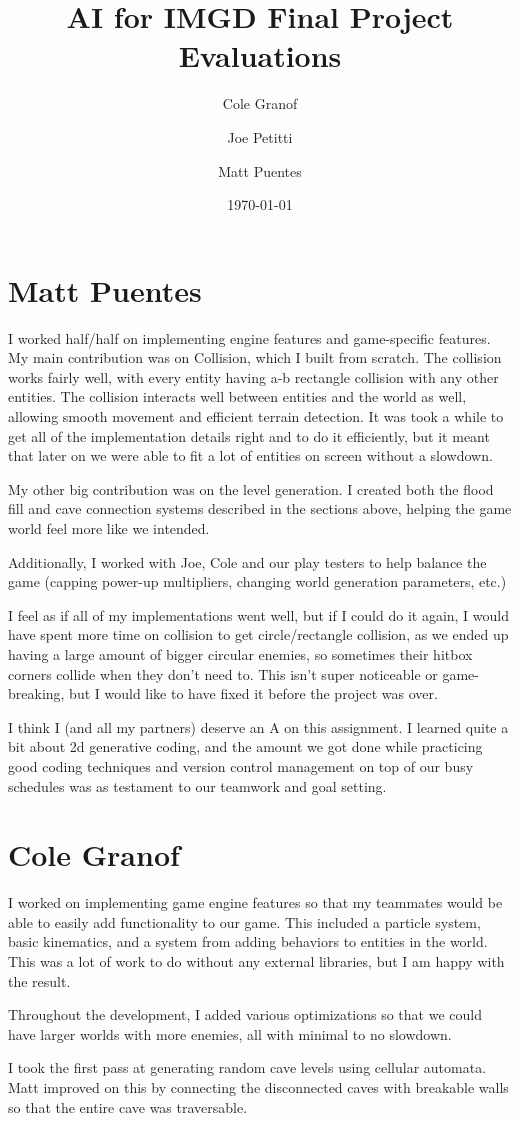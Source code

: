 \documentclass[a4paper, 12pt]{article}
\title{AI for IMGD Final Project Evaluations}
\author{Cole Granof \and Joe Petitti \and Matt Puentes}
\date{\today}
\begin{document}
\maketitle

\section{Matt Puentes}

I worked half/half on implementing engine features and game-specific features.
My main contribution was on Collision, which I built from scratch. The collision
works fairly well, with every entity having a-b rectangle collision with any
other entities. The collision interacts well between entities and the world as
well, allowing smooth movement and efficient terrain detection. It was took a
while to get all of the implementation details right and to do it efficiently, 
but it meant that later on we were able to fit a lot of entities on screen
without a slowdown.

My other big contribution was on the level generation. I created both the
flood fill and cave connection systems described in the sections above, helping
the game world feel more like we intended.

Additionally, I worked with Joe, Cole and our play testers to help balance the
game (capping power-up multipliers, changing world generation parameters, etc.)

I feel as if all of my implementations went well, but if I could do it again, I
would have spent more time on collision to get circle/rectangle collision, as we
ended up having a large amount of bigger circular enemies, so sometimes their
hitbox corners collide when they don't need to. This isn't super noticeable or
game-breaking, but I would like to have fixed it before the project was over.

I think I (and all my partners) deserve an A on this assignment. I learned quite
a bit about 2d generative coding, and the amount we got done while practicing
good coding techniques and version control management on top of our busy
schedules was as testament to our teamwork and goal setting.

\section{Cole Granof}

I worked on implementing game engine features so that my teammates would be able
to easily add functionality to our game. This included a particle system, basic
kinematics, and a system from adding behaviors to entities in the world. This
was a lot of work to do without any external libraries, but I am happy with the
result.

Throughout the development, I added various optimizations so that we could have
larger worlds with more enemies, all with minimal to no slowdown.

I took the first pass at generating random cave levels using cellular automata.
Matt improved on this by connecting the disconnected caves with breakable walls
so that the entire cave was traversable.
\end{document}
